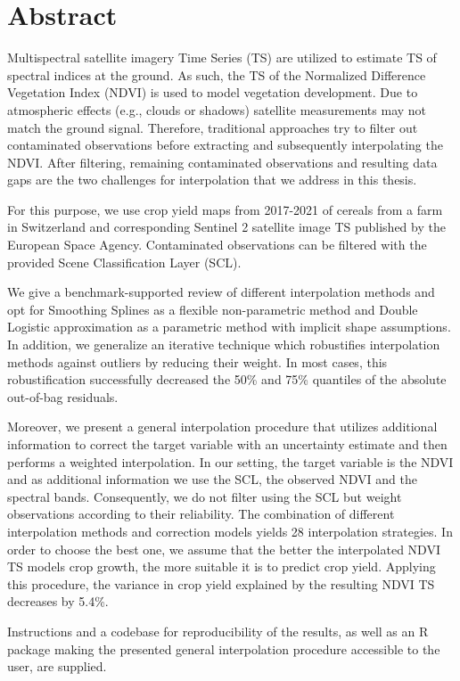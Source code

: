 \chapter*{Abstract}

Multispectral satellite imagery Time Series (TS) are utilized to estimate TS of spectral indices at the ground. As such, the TS of the Normalized Difference Vegetation Index (NDVI) is used to model vegetation development. 
Due to atmospheric effects (e.g., clouds or shadows) satellite measurements may not match the ground signal. Therefore, traditional approaches try to filter out contaminated observations before extracting and subsequently interpolating the NDVI. After filtering, remaining contaminated observations and resulting data gaps are the two challenges for interpolation that we address in this thesis.

For this purpose, we use crop yield maps from 2017-2021 of cereals from a farm in Switzerland and corresponding Sentinel 2 satellite image TS published by the European Space Agency. Contaminated observations can be filtered with the provided Scene Classification Layer (SCL). 

We give a benchmark-supported review of different interpolation methods and opt for Smoothing Splines as a flexible non-parametric method and Double Logistic approximation as a parametric method with implicit shape assumptions. In addition, we generalize an iterative technique which robustifies interpolation methods against outliers by reducing their weight. In most cases, this robustification successfully decreased the 50\% and 75\% quantiles of the absolute out-of-bag residuals. 

Moreover, we present a general interpolation procedure that utilizes additional information to correct the target variable with an uncertainty estimate and then performs a weighted interpolation. In our setting, the target variable is the NDVI and as additional information we use the SCL, the observed NDVI and the spectral bands. Consequently, we do not filter using the SCL but weight observations according to their reliability. The combination of different interpolation methods and correction models yields 28 interpolation strategies. In order to choose the best one, we assume that the better the interpolated NDVI TS models crop growth, the more suitable it is to predict crop yield. 
Applying this procedure, the variance in crop yield explained by the resulting NDVI TS decreases by 5.4\%. 

Instructions and a codebase for reproducibility of the results, as well as an R package making the presented general interpolation procedure accessible to the user, are supplied. 



